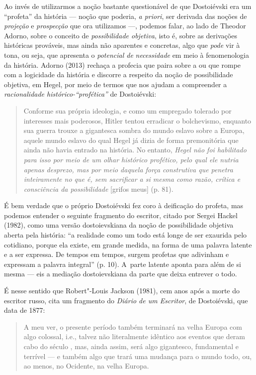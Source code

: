 Ao invés de utilizarmos a noção bastante questionável de que Dostoiévski
era um ``profeta'' da história --- noção que poderia, \emph{a priori},
ser derivada das noções de \emph{projeção} e \emph{prospecção} que ora
utilizamos ---, podemos falar, ao lado de Theodor Adorno, sobre o
conceito de \emph{possibilidade objetiva}, isto é, sobre as derivações
históricas prováveis, mas ainda não aparentes e concretas, algo que
\emph{pode} vir à tona, ou seja, que apresenta o \emph{potencial de}
\emph{necessidade} em meio à fenomenologia da história. Adorno (2013)
rechaça a profecia que paira sobre a ou que rompe com a logicidade da
história e discorre a respeito da noção de possibilidade objetiva, em
Hegel, por meio de termos que nos ajudam a compreender a
\emph{racionalidade histórico-``profética''} de Dostoiévski:

\begin{quote}
Conforme sua própria ideologia, e como um empregado tolerado por
interesses mais poderosos, Hitler tentou erradicar o bolchevismo,
enquanto sua guerra trouxe a gigantesca sombra do mundo eslavo sobre a
Europa, aquele mundo eslavo do qual Hegel já dizia de forma premonitória
que ainda não havia entrado na história. No entanto, \emph{Hegel não foi
habilitado para isso por meio de um olhar histórico profético, pelo qual
ele nutria apenas desprezo, mas por meio daquela força construtiva que
penetra inteiramente no que é, sem sacrificar a si mesma como razão,
crítica e consciência da possibilidade} {[}grifos meus{]} (p. 81).
\end{quote}

É bem verdade que o próprio Dostoiévski fez coro à deificação do
profeta, mas podemos entender o seguinte fragmento do escritor, citado
por Sergei Hackel (1982), como uma versão dostoievskiana da noção de
possibilidade objetiva aberta pela história: ``a realidade como um todo
está longe de ser exaurida pelo cotidiano, porque ela existe, em grande
medida, na forma de uma palavra latente e a ser expressa. De tempos em
tempos, surgem profetas que adivinham e expressam a palavra integral''
(p. 10). A~parte latente aponta para além de si mesma --- eis a mediação
dostoievskiana da parte que deixa entrever o todo.

É nesse sentido que Robert"-Louis Jackson (1981), cem anos após a morte
do escritor russo, cita um fragmento do \emph{Diário de um Escritor}, de
Dostoiévski, que data de 1877:

\begin{quote}
A meu ver, o presente período também terminará na velha Europa com algo
colossal, i.e., talvez não literalmente idêntico aos eventos que deram
cabo do século , mas, ainda assim, será algo gigantesco,
fundamental e terrível --- e também algo que trará uma mudança para o
mundo todo, ou, ao menos, no Ocidente, na velha Europa.
\end{quote}

